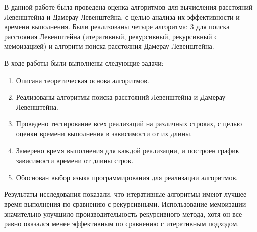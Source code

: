 
В данной работе была проведена оценка алгоритмов для вычисления расстояний Левенштейна и Дамерау-Левенштейна, с целью анализа их эффективности и времени выполнения. Были реализованы четыре алгоритма: 3 для поиска расстояния Левенштейна (итеративный, рекурсивный, рекурсивный с мемоизацией) и алгоритм поиска расстояния Дамерау-Левенштейна.

\vspace{0.5cm}
В ходе работы были выполнены следующие задачи: 
\begin{enumerate} 
\item Описана теоретическая основа алгоритмов. 
\item Реализованы алгоритмы поиска расстояний Левенштейна и Дамерау-Левенштейна. 
\item Проведено тестирование всех реализаций на различных строках, с целью оценки времени выполнения в зависимости от их длины. 
\item Замерено время выполнения для каждой реализации, и построен график зависимости времени от длины строк. 
\item Обоснован выбор языка программирования для реализации алгоритмов. 
\end{enumerate}

\vspace{0.5cm}
Результаты исследования показали, что итеративные алгоритмы имеют лучшее время выполнения по сравнению с рекурсивными. Использование мемоизации значительно улучшило производительность рекурсивного метода, хотя он все равно оказался менее эффективным по сравнению с итеративным подходом. 